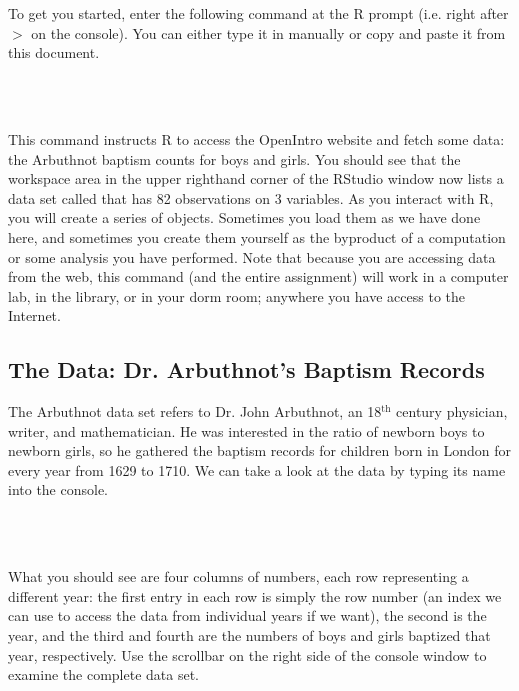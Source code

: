 \documentclass[11pt]{article}
\begin{document}
To get you started, enter the following command at the R prompt (i.e. right after $>$ on the console).  You can either type it in manually or copy and paste it from this document.

\ttfamily
\hlstd{}\hspace*{\fill}\\
\hlkeyword{(}\hlkeyword{)}\hspace*{\fill}\\
\normalfont

This command instructs R to access the OpenIntro website and fetch some data: the Arbuthnot baptism counts for boys and girls. You should see that the workspace area in the upper righthand corner of the RStudio window now lists a data set called \texttt{} that has 82 observations on 3 variables. As you interact with R, you will create a series of objects. Sometimes you load them as we have done here, and sometimes you create them yourself as the byproduct of a computation or some analysis you have performed. Note that because you are accessing data from the web, this command (and the entire assignment) will work in a computer lab, in the library, or in your dorm room; anywhere you have access to the Internet.


\subsection*{The Data: Dr. Arbuthnot's Baptism Records}

The Arbuthnot data set refers to Dr. John Arbuthnot, an 18$^{\textrm{th}}$ century physician, writer, and mathematician.  He was interested in the ratio of newborn boys to newborn girls, so he gathered the baptism records for children born in London for every year from 1629 to 1710.  We can take a look at the data by typing its name into the console.

\ttfamily
\hlstd{}\hspace*{\fill}\\
\hlstd{}\hspace*{\fill}\\
\normalfont

What you should see are four columns of numbers, each row representing a different year: the first entry in each row is simply the row number (an index we can use to access the data from individual years if we want), the second is the year, and the third and fourth are the numbers of boys and girls baptized that year, respectively. Use the scrollbar on the right side of the console window to examine the complete data set.
\end{document}
